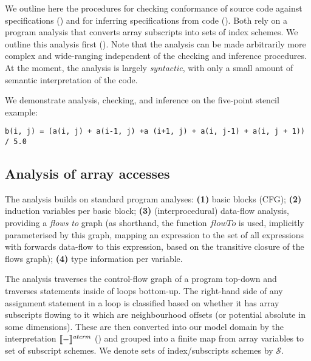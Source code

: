 \noindent
We outline here the procedures for checking conformance
of source code against specifications ()
and for inferring specifications from code ().
Both rely on a program analysis that converts array subscripts
 into sets of index schemes. We outline this analysis
first (). Note that the analysis
can be made arbitrarily more complex and wide-ranging independent
of the checking and inference procedures. At the moment, the analysis
is largely \emph{syntactic}, with only a small amount of
semantic interpretation of the code.

\begin{example}
\label{exm:checking}
We demonstrate analysis, checking, and inference on the 
five-point stencil example:
\begin{verbatim}
b(i, j) = (a(i, j) + a(i-1, j) +a (i+1, j) + a(i, j-1) + a(i, j + 1)) / 5.0
\end{verbatim}
\end{example}

\subsection{Analysis of array accesses}
\label{subsec:analysis}

\newcommand{\neigh}{\textsf{neigh}}
\noindent
The analysis builds on standard program analyses:
%
\textbf{(1)} basic blocks (CFG);
\textbf{(2)} induction variables per basic block;
\textbf{(3)} (interprocedural) data-flow analysis, providing a \emph{flows to}
  graph (as shorthand, the function
  $\mathit{flowTo}$ is used, implicitly parameterised by this graph,
  mapping an expression to the set of all expressions
  with forwards data-flow to this expression, based on the transitive
  closure of the flows graph);
\textbf{(4)} type information per variable.%

The analysis traverses the control-flow graph of a program top-down
and traverses statements inside of loops bottom-up. The right-hand
side of any assignment statement in a loop is classified based on
whether it has array subscripts flowing to it which are neighbourhood
offsets (or potential absolute in some dimensions). These are then
converted into our model domain by the interpretation
$\llbracket{} {-} \rrbracket{}^{\mathit{aterm}}$ () and grouped
into a finite map from array variables to set of subscript schemes.
We denote sets of index/subscripts schemes by
$\mathcal{S}$.

